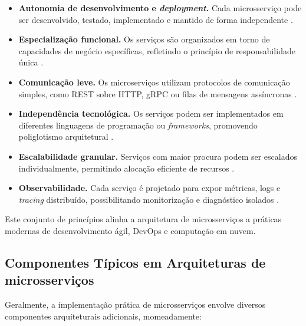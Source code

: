 \begin{itemize}
    \item \textbf{Autonomia de desenvolvimento e \textit{deployment}.} Cada microsserviço pode ser desenvolvido, testado, implementado e mantido de forma independente \cite{Newman2015}.
    
    \item \textbf{Especialização funcional.} Os serviços são organizados em torno de capacidades de negócio específicas, refletindo o princípio de responsabilidade única \cite{Newman2015}.
    
    \item \textbf{Comunicação leve.} Os microserviços utilizam protocolos de comunicação simples, como REST sobre HTTP, gRPC ou filas de mensagens assíncronas \cite{Dragoni2017}.
    
    \item \textbf{Independência tecnológica.} Os serviços podem ser implementados em diferentes linguagens de programação ou \textit{frameworks}, promovendo poliglotismo arquitetural 
    \cite{Richardson2018}.
    
    \item \textbf{Escalabilidade granular.} Serviços com maior procura podem ser escalados individualmente, permitindo alocação eficiente de recursos \cite{Lewis2014}.
    
    \item \textbf{Observabilidade.} Cada serviço é projetado para expor métricas, logs e \textit{tracing} distribuído, possibilitando monitorização e diagnóstico isolados \cite{Soldani2018}.
\end{itemize}


Este conjunto de princípios alinha a arquitetura de microsserviços a práticas modernas de desenvolvimento ágil, DevOps e computação em nuvem.

\subsection{Componentes Típicos em Arquiteturas de microsserviços}

Geralmente, a implementação prática de microsserviços envolve diversos componentes arquiteturais adicionais, momeadamente:

